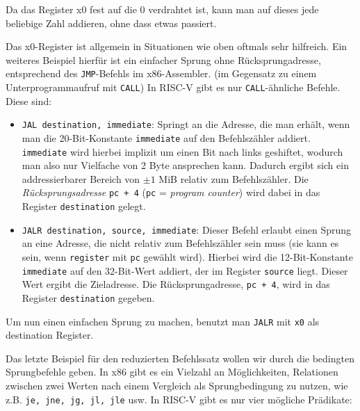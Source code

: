 Da das Register x0 fest auf die 0 verdrahtet ist, kann man auf dieses
jede beliebige Zahl addieren, ohne dass etwas passiert.

Das x0-Register ist allgemein in Situationen wie oben oftmals sehr hilfreich. Ein
weiteres Beispiel hierfür ist ein einfacher Sprung ohne Rücksprungadresse, entsprechend des  \lstinline[style=x86Assembler]!JMP!-Befehls im x86-Assembler. (im Gegensatz zu einem Unterprogrammaufruf mit
\lstinline[style=x86Assembler]!CALL!) In RISC-V gibt es nur \lstinline[style=x86Assembler]!CALL!-ähnliche Befehle. Diese sind:

\begin{itemize}
  \item \lstinline[style=risc-v_Assembler]!JAL destination, immediate!: Springt an die Adresse, die man
    erhält, wenn man die 20-Bit-Konstante \lstinline[style=risc-v_Assembler]!immediate! auf den Befehlszähler
    addiert. \lstinline[style=risc-v_Assembler]!immediate! wird hierbei implizit um einen Bit nach links
    geshiftet, wodurch man also nur Vielfache von 2 Byte ansprechen
    kann. Dadurch ergibt sich ein addressierbarer Bereich von $\pm 1$ MiB
    relativ zum Befehlszähler. Die \emph{Rücksprungsadresse} \lstinline[style=risc-v_Assembler]!pc + 4!
    (\lstinline[style=risc-v_Assembler]!pc! = \emph{program counter}) wird dabei in das Register
    \lstinline[style=risc-v_Assembler]!destination! gelegt.
 \item \lstinline[style=risc-v_Assembler]!JALR destination, source, immediate!: Dieser Befehl erlaubt einen Sprung an eine Adresse, die nicht relativ zum Befehlszähler sein muss (sie
   kann es sein, wenn \lstinline[style=risc-v_Assembler]!register! mit \lstinline[style=risc-v_Assembler]!pc! gewählt wird). Hierbei wird
   die 12-Bit-Konstante \lstinline[style=risc-v_Assembler]!immediate! auf den 32-Bit-Wert addiert, der im Register
   \lstinline[style=risc-v_Assembler]!source! liegt. Dieser Wert ergibt die Zieladresse. Die
   Rücksprungadresse, \lstinline[style=risc-v_Assembler]!pc + 4!, wird in das Register \lstinline[style=risc-v_Assembler]!destination!
   gegeben.
\end{itemize}

Um nun einen einfachen Sprung zu machen, benutzt man \lstinline[style=risc-v_Assembler]!JALR! mit \lstinline[style=risc-v_Assembler]!x0! als
destination Register.

Das letzte Beispiel für den reduzierten Befehlssatz wollen wir durch die
bedingten Sprungbefehle geben. In x86 gibt es ein Vielzahl an Möglichkeiten,
Relationen zwischen zwei Werten nach einem Vergleich als Sprungbedingung zu
nutzen, wie z.B. \lstinline[style=x86Assembler]!je, jne, jg, jl, jle! usw. In
RISC-V gibt es nur vier mögliche Prädikate:

